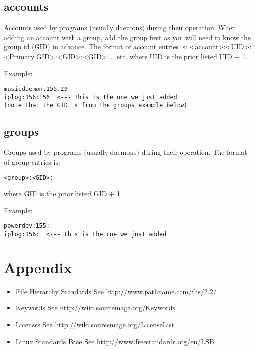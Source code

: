\documentclass[a4paper,10pt]{book}
\begin{document}
\section{accounts}
Accounts used by programs (usually daemons) during their operation. When
adding an account with a group, add the group first as you will need to
know the group id (GID) in advance. The format of account entries is:
	<account>:<UID>:<Primary GID>:<GID>:<GID>:... etc.
where UID is the prior listed UID + 1.

Example:
\begin{verbatim}
musicdaemon:155:29
iplog:156:156  <--- This is the one we just added
(note that the GID is from the groups example below)
\end{verbatim}

\section{groups}
Groups used by programs (usually daemons) during their operation. The format
of group entries is:
\begin{verbatim}
<group>:<GID>:
\end{verbatim}
where GID is the prior listed GID + 1.

Example:
\begin{verbatim}
powerdev:155:
iplog:156:  <--- this is the one we just added
\end{verbatim}

\chapter{Appendix}
\begin{itemize}
\item File Hierarchy Standards
	See http://www.pathname.com/fhs/2.2/
\item Keywords
	See http://wiki.sourcemage.org/Keywords
\item Licenses
	See http://wiki.sourcemage.org/LicenseList
\item Linux Standards Base
	See http://www.freestandards.org/en/LSB
\end{itemize}
\end{document}
